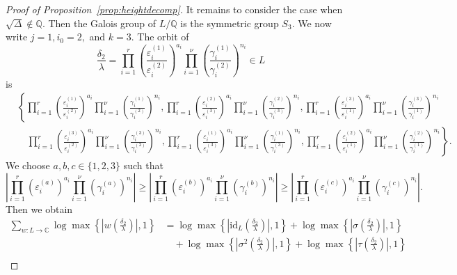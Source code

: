 \begin{proof}[Proof of Proposition~\ref{prop:heightdecomp}]
It remains to consider the case when $\sqrt{\Delta} \notin \mathbb{Q}$. Then the Galois group of $L/\mathbb{Q}$ is the symmetric group $S_3$. We now write $j = 1, i_0 = 2,$ and $k = 3$. The orbit of 
\[\frac{\delta_2}{\lambda}= \prod_{i = 1}^{r}\left( \frac{\varepsilon_i^{(1)}}{\varepsilon_i^{(2)}}\right)^{a_i} \prod_{i = 1}^{\nu} \left( \frac{\gamma_i^{(1)}}{\gamma_i^{(2)}}\right)^{n_i}\in L\]
is
\begin{align*}
& \left\{ \prod_{i = 1}^{r}\left( \frac{\varepsilon_i^{(1)}}{\varepsilon_i^{(2)}}\right)^{a_i} \prod_{i = 1}^{\nu} \left( \frac{\gamma_i^{(1)}}{\gamma_i^{(2)}}\right)^{n_i} , 
	\prod_{i = 1}^{r}\left( \frac{\varepsilon_i^{(2)}}{\varepsilon_i^{(3)}}\right)^{a_i} \prod_{i = 1}^{\nu} \left( \frac{\gamma_i^{(2)}}{\gamma_i^{(3)}}\right)^{n_i}, 
	\prod_{i = 1}^{r}\left( \frac{\varepsilon_i^{(3)}}{\varepsilon_i^{(1)}}\right)^{a_i} \prod_{i = 1}^{\nu} \left( \frac{\gamma_i^{(3)}}{\gamma_i^{(1)}}\right)^{n_i} \right. \\
	& \quad \left. \prod_{i = 1}^{r}\left( \frac{\varepsilon_i^{(3)}}{\varepsilon_i^{(2)}}\right)^{a_i} \prod_{i = 1}^{\nu} \left( \frac{\gamma_i^{(3)}}{\gamma_i^{(2)}}\right)^{n_i} , 
	\prod_{i = 1}^{r}\left( \frac{\varepsilon_i^{(1)}}{\varepsilon_i^{(3)}}\right)^{a_i} \prod_{i = 1}^{\nu} \left( \frac{\gamma_i^{(1)}}{\gamma_i^{(3)}}\right)^{n_i}, 
	\prod_{i = 1}^{r}\left( \frac{\varepsilon_i^{(2)}}{\varepsilon_i^{(1)}}\right)^{a_i} \prod_{i = 1}^{\nu} \left( \frac{\gamma_i^{(2)}}{\gamma_i^{(1)}}\right)^{n_i} \right\}.
\end{align*}
We choose $a,b,c\in\{1,2,3\}$ such that 
\[ \left|\prod_{i = 1}^{r}\left( \varepsilon_i^{(a)}\right)^{a_i} \prod_{i = 1}^{\nu} \left( \gamma_i^{(a)}\right)^{n_i}\right| \geq
	\left|\prod_{i = 1}^{r}\left( \varepsilon_i^{(b)}\right)^{a_i} \prod_{i = 1}^{\nu} \left( \gamma_i^{(b)}\right)^{n_i}\right| \geq
	\left|\prod_{i = 1}^{r}\left( \varepsilon_i^{(c)}\right)^{a_i} \prod_{i = 1}^{\nu} \left( \gamma_i^{(c)}\right)^{n_i}\right|.\]
Then we obtain
\begin{align*}
\sum_{w :L \to \mathbb{C}} \log \max \left\{ \left|w\left(\frac{\delta_2}{\lambda}\right)\right|, 1\right\}
	& = \log \max \left\{ \left|\text{id}_L\left(\frac{\delta_2}{\lambda}\right)\right|, 1\right\} 
		+ \log \max \left\{ \left|\sigma\left(\frac{\delta_2}{\lambda}\right)\right|,1\right\} \\
		& \quad+ \log \max \left\{ \left|\sigma^2\left(\frac{\delta_2}{\lambda}\right)\right|, 1\right\} + \log \max \left\{ \left|\tau\left(\frac{\delta_2}{\lambda}\right)\right|, 1\right\}\\

\end{align*}
\end{proof}
